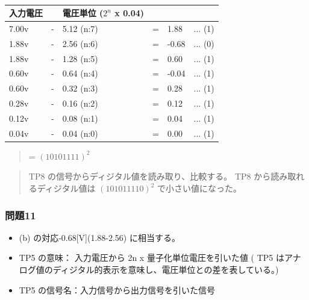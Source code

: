 \documentclass[10pt]{article}
\begin{document}
\begingroup
\setlength{\tabcolsep}{5pt} %
\renewcommand{\arraystretch}{1.5} %
\begin{table}[H]
    \centering
    \caption{}
	\begin{tabular}{|llllll|}
	    \hline
	    入力電圧 &  & 電圧単位 ($2^n$ x 0.04) &  & & \\[0.5ex]
		\hline\hline
		7.00v　& - & 5.12 (n:7) & = & 1.88 & ... (1)	 \\ \hline
		1.88v　& - & 2.56 (n:6) & = & -0.68 & ... (0)	 \\ \hline
		1.88v　& - & 1.28 (n:5) & = & 0.60 & ... (1)	 \\ \hline
		0.60v　& - & 0.64 (n:4) & = & -0.04 & ... (1)	 \\ \hline
		0.60v　& - & 0.32 (n:3) & = & 0.28 & ... (1)	 \\ \hline
		0.28v　& - & 0.16 (n:2) & = & 0.12 & ... (1)	 \\ \hline
		0.12v　& - & 0.08 (n:1) & = & 0.04 & ... (1)	 \\ \hline
		0.04v　& - & 0.04 (n:0) & = & 0.00 & ... (1)	 \\ \hline
		
	\end{tabular}
\end{table} 
\endgroup

\begin{quote}
    \centering
    = $(10101111)^2$
\end{quote}

\begin{quote}
    \centering
    TP8 の信号からディジタル値を読み取り、比較する。 TP8 から読み取れるディジタル値は $(101011110)^2$ で小さい値になった。
\end{quote}



\subsubsection{問題11}
\begin{itemize}
\centering
    \item (b) の対応-0.68[V](1.88-2.56) に相当する。 
    \item TP5 の意味： 入力電圧から 2n x 量子化単位電圧を引いた値 ( TP5 はアナログ値のディジタル的表示を意味し、電圧単位との差を表している。)
    \item TP5 の信号名：入力信号から出力信号を引いた信号
\end{itemize}
\end{document}

